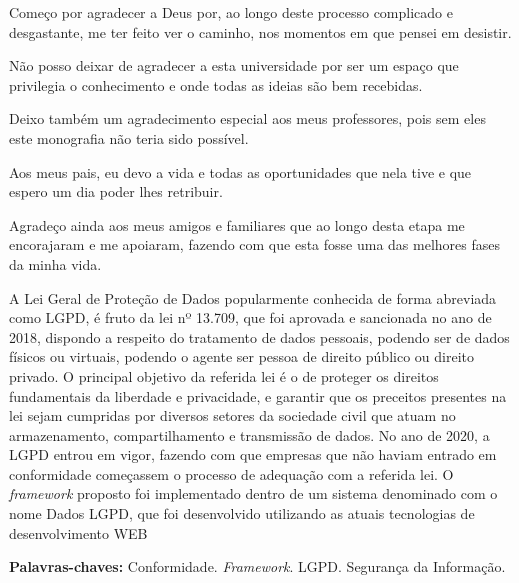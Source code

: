 \documentclass[
	12pt,				%
	openright,			%
	oneside,			%
	a4paper,			%
	english,			%
	french,				%
	spanish,			%
	brazil,				%
	]{abntex2}
\begin{document}
\begin{agradecimentos}

Começo por agradecer a Deus por, ao longo deste processo complicado e desgastante, me ter feito ver o caminho, nos momentos em que pensei em desistir.

Não posso deixar de agradecer a esta universidade por ser um espaço que privilegia o conhecimento e onde todas as ideias são bem recebidas.

Deixo também um agradecimento especial aos meus professores, pois sem eles este monografia não teria sido possível.

Aos meus pais, eu devo a vida e todas as oportunidades que nela tive e que espero um dia poder lhes retribuir.

Agradeço ainda aos meus amigos e familiares que ao longo desta etapa me encorajaram e me apoiaram, fazendo com que esta fosse uma das melhores fases da minha vida.

\end{agradecimentos}



\begin{resumo}
\noindent
A Lei Geral de Proteção de Dados popularmente conhecida de forma abreviada como LGPD, é fruto da lei nº 13.709, que foi aprovada e sancionada no ano de 2018, dispondo a respeito do tratamento de dados pessoais, podendo ser de dados físicos ou virtuais, podendo o agente ser pessoa de direito público ou direito privado. O principal objetivo da referida lei é o de proteger os direitos fundamentais da liberdade e privacidade, e garantir que os preceitos presentes na lei sejam cumpridas por diversos setores da sociedade civil que atuam no armazenamento, compartilhamento e transmissão de dados. No ano de 2020, a LGPD entrou em vigor, fazendo com que empresas que não haviam entrado em conformidade começassem o processo de adequação com a referida lei. O \textit{framework} proposto foi implementado dentro de um sistema denominado com o nome Dados LGPD, que foi desenvolvido utilizando as atuais tecnologias de desenvolvimento WEB

 \vspace{\onelineskip}
    
 \noindent
 \textbf{Palavras-chaves:} Conformidade. \textit{Framework}. LGPD. Segurança da Informação.
\end{resumo}
\end{document}
